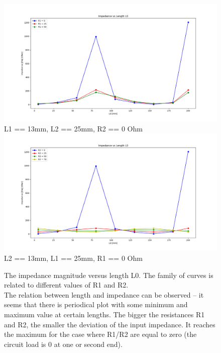 \documentclass[eng,printmode]{mgr}
\begin{document}
\begin{figure}[!h]
	\centering
	\includegraphics[width=1\linewidth]{Figure_4}
	L1 == 13mm, L2 == 25mm, R2 == 0 Ohm
	\includegraphics[width=1\linewidth]{Figure_5}
	L2 == 13mm, L1 == 25mm, R1 == 0 Ohm
	\caption{The impedance magnitude versus length L0. The family of curves is related to different values of R1 and R2.\\
	The relation between length and impedance can be observed -- it seems that there is periodical plot with some minimum and maximum value at certain lengths. The bigger the resistances R1 and R2, the smaller the deviation of the input impedance. It reaches the maximum for the case where R1/R2 are equal to zero (the circuit load is 0 at one or second end).
	}
\end{figure}
\end{document}
